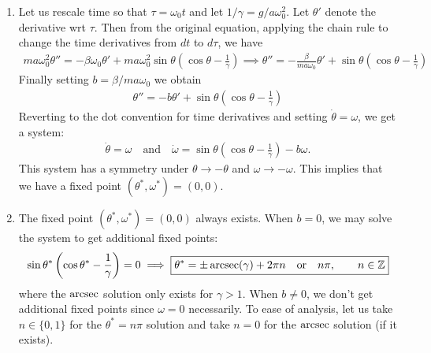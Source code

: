 \documentclass{article}
\theoremstyle{definition}
\newcommand{\be}{\beta}
\newcommand{\f}[2]{\frac{#1}{#2}}
\newcommand{\lp}{\left(}
\newcommand{\rp}{\right)}
\begin{document}
\begin{enumerate}[label=(\alph*)]
	\item Let us rescale time so that $\tau = \omega_0 t$ and let $1/\gamma = g/a\omega_0^2$. Let $\theta'$ denote the derivative wrt $\tau$. Then from the original equation, applying the chain rule to change the time derivatives from $dt$ to $d\tau$, we have
	\begin{align*}
	ma \omega_0^2 \theta'' = -\be \omega_0 \theta' + ma\omega_0^2\sin\theta \lp \cos\theta - \f{1}{\gamma}\rp \implies \theta'' = -\f{\be}{ma \omega_0}\theta' + \sin\theta \lp \cos\theta - \f{1}{\gamma}\rp
	\end{align*}
	Finally setting $b = \be / ma \omega_0$ we obtain
	\begin{align*}
	\theta'' = -b \theta' + \sin\theta \lp \cos\theta - \f{1}{\gamma}\rp
	\end{align*}  
	Reverting to the dot convention for time derivatives and setting $\dot \theta = \omega$, we get a system:
	\begin{align*}
	\dot \theta = \omega \quad\text{and} \quad \dot \omega = \sin\theta \lp \cos\theta - \f{1}{\gamma}\rp - b \omega.
	\end{align*}
	This system has a symmetry under $\theta \to -\theta$ and $\omega \to -\omega$. This implies that we have a fixed point $(\theta^*, \omega^*) = (0,0)$. 
	
	
	
	\item The fixed point $(\theta^*, \omega^*) = (0,0)$ always exists. When $b=0$, we may solve the system to get additional fixed points:
	\begin{align*}
	\sin\theta^*\lp \cos\theta^* - \f{1}{\gamma} \rp = 0 \implies \boxed{\theta^* = \pm \arcsec(\gamma) + 2\pi n \quad\text{or}\quad n\pi, \quad\quad n\in \mathbb{Z} }
	\end{align*}
	where the $\arcsec$ solution only exists for $\gamma > 1$. When $b\neq 0$, we don't get additional fixed points since $\omega = 0$ necessarily. To ease of analysis, let us take $n\in \{0,1 \}$ for the $\theta^* = n\pi$ solution and take $n=0$ for the $\arcsec$ solution (if it exists). 
	

\end{enumerate}
\end{document}
